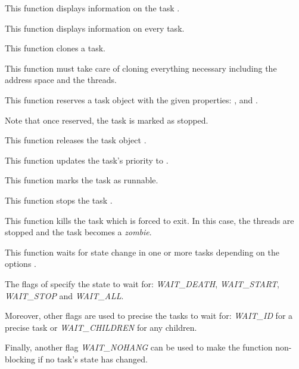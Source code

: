 	 {
	   This function displays information on the task .
	 }

	 {
	   This function displays information on every task.
	 }

	 {
	   This function clones a task.

	   This function must take care of cloning everything necessary
	   including the address space and the threads.
	 }

	 {
	   This function reserves a task object with the given
	   properties: ,  and
	   .

	   Note that once reserved, the task is marked as stopped.
	 }

	 {
	   This function releases the task object .
	 }

	 {
	   This function updates the task's priority to .
	 }

	 {
	   This function marks the task as runnable.
	 }

	 {
	   This function stops the task .
	 }

	 {
	   This function kills the task  which is forced to
	   exit. In this case, the threads are stopped and the task becomes
	   a \textit{zombie}.
	 }

	 {
	   This function waits for state change in one or more tasks
	   depending on the options .

	   The flags of  specify the state to wait for:
	   \textit{WAIT\_DEATH}, \textit{WAIT\_START},
	   \textit{WAIT\_STOP} and \textit{WAIT\_ALL}.

	   Moreover, other flags are used to precise the tasks to wait for:
	   \textit{WAIT\_ID} for a precise task  or
	   \textit{WAIT\_CHILDREN} for any children.

	   Finally, another flag \textit{WAIT\_NOHANG} can be used
	   to make the function non-blocking if no task's state has changed.


	 }

